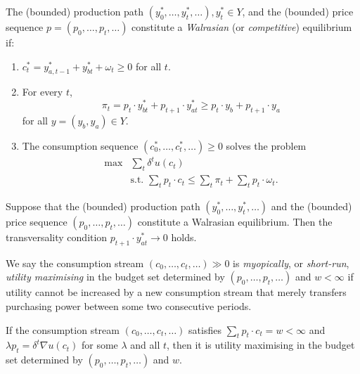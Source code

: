\begin{defn}
    The (bounded) production path $(y^*_0, \dots, y^*_t, \dots), y^*_t \in Y$, and the (bounded) price sequence $p = (p_0, \dots, p_t, \dots)$ constitute a \emph{Walrasian} (or \emph{competitive}) equilibrium if:
    \begin{enumerate}
        \item 
        $c^*_t = y^*_{a, t - 1} + y^*_{bt} + \omega_t \geq 0$ for all $t$.

        \item 
        For every $t$,
        \begin{equation*}
            \pi_t = p_t \cdot y^*_{bt} + p_{t + 1} \cdot y^*_{at} \geq p_t \cdot y_b + p_{t + 1} \cdot y_a
        \end{equation*}
        for all $y = (y_b, y_a) \in Y$.

        \item 
        The consumption sequence $(c^*_0, \dots, c^*_t, \dots) \geq 0$ solves the problem
        \begin{equation*}
            \begin{aligned}
                \max &\sum_t \delta^t u(c_t) \\
                &\text{s.t. } \sum_t p_t \cdot c_t \leq \sum_t \pi_t + \sum_t p_t \cdot \omega_t.
            \end{aligned}
        \end{equation*}
    \end{enumerate}
\end{defn}

\begin{prop}
    Suppose that the (bounded) production path $(y^*_0, \dots, y^*_t, \dots)$ and the (bounded) price sequence $(p_0, \dots, p_t, \dots)$ constitute a Walrasian equilibrium. Then the transversality condition $p_{t + 1} \cdot y^*_{at} \rightarrow 0$ holds.
\end{prop}

\begin{defn}
    We say the consumption stream $(c_0, \dots, c_t, \dots) \gg 0$ is \emph{myopically}, or \emph{short-run}, \emph{utility maximising} in the budget set determined by $(p_0, \dots, p_t, \dots)$ and $w < \infty$ if utility cannot be increased by a new consumption stream that merely transfers purchasing power between some two consecutive periods.
\end{defn}

\begin{prop}
    If the consumption stream $(c_0, \dots, c_t, \dots)$ satisfies $\sum_t p_t \cdot c_t = w < \infty$ and $\lambda p_t = \delta^t \nabla u(c_t)$ for some $\lambda$ and all $t$, then it is utility maximising in the budget set determined by $(p_0, \dots, p_t, \dots)$ and $w$.
\end{prop}

